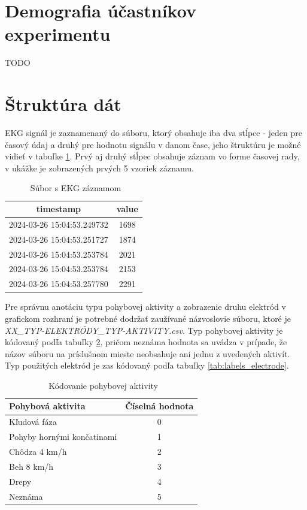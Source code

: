 \section{Demografia účastníkov experimentu}

TODO

\section{Štruktúra dát}

EKG signál je zaznamenaný do súboru, ktorý obsahuje iba dva stĺpce - jeden pre časový údaj a druhý pre hodnotu signálu v danom čase, jeho štruktúru je možné vidieť v tabuľke \ref{tab:input}. Prvý aj druhý stĺpec obsahuje záznam vo forme časovej rady, v ukážke je zobrazených prvých 5 vzoriek záznamu.

\begin{table}[H]\centering
\caption[]{~Súbor s EKG záznamom}\label{tab:input}
    \begin{tabular}{c|c}
    	\textbf{timestamp} 	        & \textbf{value}   \tabularnewline \hline 
     	2024-03-26 15:04:53.249732  & 1698	           \tabularnewline \hline
     	2024-03-26 15:04:53.251727 	& 1874	           \tabularnewline \hline
        2024-03-26 15:04:53.253784 	& 2021	           \tabularnewline \hline
        2024-03-26 15:04:53.253784  & 2153	           \tabularnewline \hline
        2024-03-26 15:04:53.257780  & 2291	           \tabularnewline
    \end{tabular}
\end{table}

Pre správnu anotáciu typu pohybovej aktivity a zobrazenie druhu elektród v grafickom rozhraní je potrebné dodržať zaužívané názvoslovie súboru, ktoré je \textit{XX\_TYP-ELEKTRÓDY\_TYP-AKTIVITY.csv}. Typ pohybovej aktivity je kódovaný podľa tabuľky \ref{tab:labels_activity}, pričom neznáma hodnota sa uvádza v prípade, že názov súboru na príslušnom mieste neobsahuje ani jednu z uvedených aktivít. Typ použitých elektród je zas kódovaný podľa tabuľky \ref{tab:labels_electrode}.

\begin{table}[H]\centering
\caption[]{~Kódovanie pohybovej aktivity}\label{tab:labels_activity}
    \begin{tabular}{l|c}
    	\textbf{Pohybová aktivita}  & \textbf{Číselná hodnota}    \tabularnewline \hline 
     	Kľudová fáza                & 0	                          \tabularnewline \hline
     	Pohyby hornými končatinami 	& 1	                          \tabularnewline \hline
        Chôdza 4 km/h 	            & 2	                          \tabularnewline \hline
        Beh 8 km/h                  & 3	                          \tabularnewline \hline
        Drepy                       & 4	                          \tabularnewline \hline
        Neznáma                     & 5	                          \tabularnewline
    \end{tabular}
\end{table}

